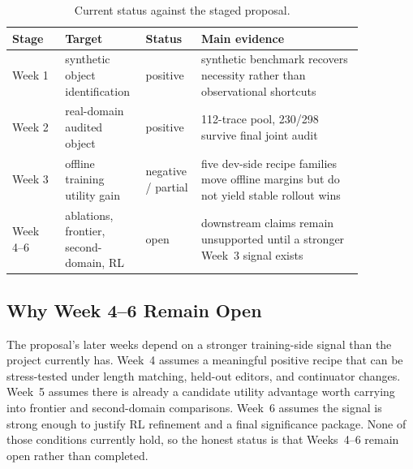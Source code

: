 \begin{table}[t]
  \centering
  \small
  \begin{tabular}{p{0.14\linewidth} p{0.17\linewidth} p{0.12\linewidth} p{0.43\linewidth}}
    \toprule
    Stage & Target & Status & Main evidence \\
    \midrule
    Week 1 & synthetic object identification & positive & synthetic benchmark recovers necessity rather than observational shortcuts \\
    Week 2 & real-domain audited object & positive & 112-trace pool, 230/298 survive final joint audit \\
    Week 3 & offline training utility gain & negative / partial & five dev-side recipe families move offline margins but do not yield stable rollout wins \\
    Week 4--6 & ablations, frontier, second-domain, RL & open & downstream claims remain unsupported until a stronger Week~3 signal exists \\
    \bottomrule
  \end{tabular}
  \caption{Current status against the staged proposal.}
  \label{tab:status}
\end{table}

\subsection{Why Week 4--6 Remain Open}

The proposal's later weeks depend on a stronger training-side signal than the project currently has. Week~4 assumes a meaningful positive recipe that can be stress-tested under length matching, held-out editors, and continuator changes. Week~5 assumes there is already a candidate utility advantage worth carrying into frontier and second-domain comparisons. Week~6 assumes the signal is strong enough to justify RL refinement and a final significance package. None of those conditions currently hold, so the honest status is that Weeks~4--6 remain open rather than completed.
